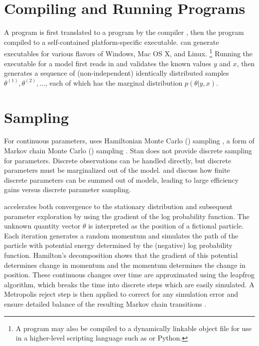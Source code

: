 \section{Compiling and Running \Stan Programs}

A \Stan program is first translated to a \Cpp program by the \Stan
compiler \stanc, then the \Cpp program compiled to a self-contained
platform-specific executable.  \Stan can generate executables for
various flavors of Windows, Mac OS X, and Linux.%
%
\footnote{A \Stan program may also be compiled to a dynamically
  linkable object file for use in a higher-level scripting language
  such as \R or Python.}
%
Running the \Stan executable for a model first reads in and validates
the known values $y$ and $x$, then generates a sequence of
(non-independent) identically distributed samples $\theta^{(1)},
\theta^{(2)}, \ldots$, each of which has the marginal distribution
$p(\theta|y,x)$.


\section{Sampling}

For continuous parameters, \Stan uses Hamiltonian Monte Carlo (\HMC)
sampling \citep{Duane:1987, Neal:1994, Neal:2011}, a form of Markov
chain Monte Carlo (\MCMC) sampling \citep{Metropolis:1953}.  Stan does
not provide discrete sampling for parameters. Discrete observations
can be handled directly, but discrete parameters must be marginalized
out of the model.   and
 discuss how finite discrete parameters
can be summed out of models, leading to large efficiency gains versus
discrete parameter sampling.

\HMC accelerates both convergence to the stationary distribution and
subsequent parameter exploration by using the gradient of the log
probability function.  The unknown quantity vector $\theta$ is
interpreted as the position of a fictional particle.  Each iteration
generates a random momentum and simulates the path of the particle
with potential energy determined by the (negative) log probability
function.  Hamilton's decomposition shows that the gradient of this
potential determines change in momentum and the momentum determines
the change in position.  These continuous changes over time are
approximated using the leapfrog algorithm, which breaks the time into
discrete steps which are easily simulated.  A Metropolis reject step
is then applied to correct for any simulation error and ensure
detailed balance of the resulting Markov chain transitions
\citep{Metropolis:1953, Hastings:1970}.

